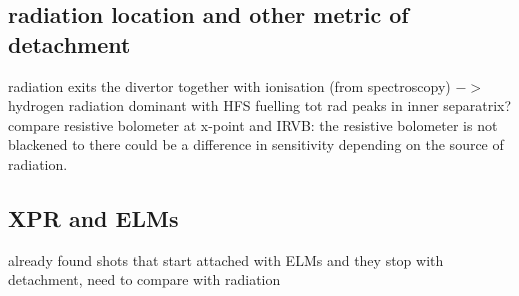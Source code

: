 \subsection{radiation location and other metric of detachment}
radiation exits the divertor together with ionisation (from spectroscopy) $->$ hydrogen radiation dominant
with HFS fuelling tot rad peaks in inner separatrix?
compare resistive bolometer at x-point and IRVB: the resistive bolometer is not blackened to there could be a difference in sensitivity depending on the source of radiation.
\subsection{XPR and ELMs}
already found shots that start attached with ELMs and they stop with detachment, need to compare with radiation
